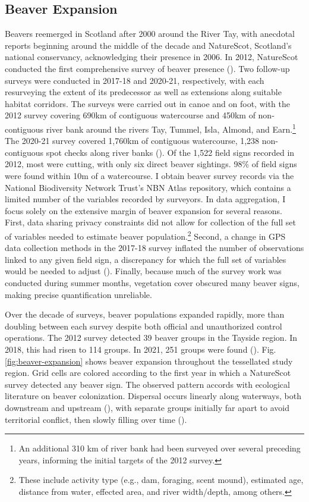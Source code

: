 \subsection{Beaver Expansion}
Beavers reemerged in Scotland after 2000 around the River Tay, with anecdotal reports beginning around the middle of the decade and NatureScot, Scotland's national conservancy, acknowledging their presence in 2006. In 2012, NatureScot conducted the first comprehensive survey of beaver presence (\cite{campbell_rd_naturescot_2012}). Two follow-up surveys were conducted in 2017-18 and 2020-21, respectively, with each resurveying the extent of its predecessor as well as extensions along suitable habitat corridors. The surveys were carried out in canoe and on foot, with the 2012 survey covering 690km of contiguous watercourse and 450km of non-contiguous river bank around the rivers Tay, Tummel, Isla, Almond, and Earn.\footnote{An additional 310 km of river bank had been surveyed over several preceding years, informing the initial targets of the 2012 survey.} The 2020-21 survey covered 1,760km of contiguous watercourse, 1,238 non-contiguous spot checks along river banks (\cite{campbell-palmer_r_naturescot_2021}). Of the 1,522 field signs recorded in 2012, most were cutting, with only six direct beaver sightings. 98\% of field signs were found within 10m of a watercourse. I obtain beaver survey records via the National Biodiversity Network Trust's NBN Atlas repository, which contains a limited number of the variables recorded by surveyors. In data aggregation, I focus solely on the extensive margin of beaver expansion for several reasons. First, data sharing privacy constraints did not allow for collection of the full set of variables needed to estimate beaver population.\footnote{These include activity type (e.g., dam, foraging, scent mound), estimated age, distance from water, effected area, and river width/depth, among others.} Second, a change in GPS data collection methods in the 2017-18 survey inflated the number of observations linked to any given field sign, a discrepancy for which the full set of variables would be needed to adjust (\cite{campbell-palmer_r_naturescot_2018}). Finally, because much of the survey work was conducted during summer months, vegetation cover obscured many beaver signs, making precise quantification unreliable.

Over the decade of surveys, beaver populations expanded rapidly, more than doubling between each survey despite both official and unauthorized control operations. The 2012 survey detected 39 beaver groups in the Tayside region. In 2018, this had risen to 114 groups. In 2021, 251 groups were found (\cite{campbell-palmer_r_naturescot_2021}). Fig. \ref{fig:beaver-expansion} shows beaver expansion throughout the tessellated study region. Grid cells are colored according to the first year in which a NatureScot survey detected any beaver sign. The observed pattern accords with ecological literature on beaver colonization. Dispersal occurs linearly along waterways, both downstream and upstream (\cite{muller-schwarze_beaver_2011}), with separate groups initially far apart to avoid territorial conflict, then slowly filling over time (\cite{hartman_patterns_1995}).

